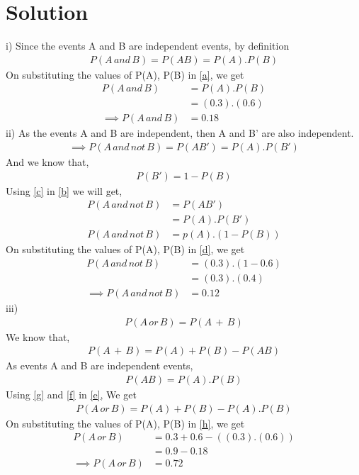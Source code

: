 \documentclass[journal,12pt,twocolumn]{IEEEtran}
\begin{document}
\section{Solution}
i)
Since the events A and B are independent events, by definition
\begin{align}
    P(A\, and\, B) = P(AB) = P(A).P(B)\label{a}
\end{align}
On substituting the values of P(A), P(B) in \eqref{a}, we get
\begin{align}
    P(A\, and\, B) &= P(A).P(B)\\
    &= (0.3).(0.6)\\
    \implies P(A\, and\, B)&=0.18
\end{align}
ii)
As the events A and B are independent, then A and B' are also independent.
\begin{align}   
\implies P(A\, and\,not\, B) =P(AB') = P(A).P(B')\label{b}
\end{align}
And we know that,
\begin{align}
    P(B')=1-P(B)\label{c}
\end{align}
Using \eqref{c} in \eqref{b} we will get,
\begin{align}
    P(A\, and\,not\, B) &=P(AB') \\
    &= P(A).P(B')\\
    P(A\, and\,not\, B)&= p(A).(1-P(B))\label{d}
\end{align}
On substituting the values of P(A), P(B) in \eqref{d}, we get
\begin{align}
    P(A\, and\, not\, B) &= (0.3).(1-0.6)\\
    &= (0.3).(0.4)\\
    \implies P(A\, and\, not\, B)&= 0.12
\end{align}
iii)
\begin{align}
    P(A\,or\,B) =P(A\,+\,B)\label{e}
\end{align}
We know that,
\begin{align}
    P(A\, +\, B) = P(A) + P(B) -P(AB)\label{f}
\end{align}
As events A and B are independent events,
\begin{align}
    P(AB)=P(A).P(B)\label{g}
\end{align}
Using \eqref{g} and \eqref{f} in \eqref{e}, We get
\begin{align}
    P(A\,or\,B) = P(A) + P(B) - P(A).P(B)\label{h}
\end{align}
On substituting the values of P(A), P(B) in \eqref{h}, we get
\begin{align}
    P(A\,or\,B) &= 0.3 + 0.6 -((0.3).(0.6))\\
    &= 0.9-0.18\\
    \implies P(A\,or\,B) &= 0.72\label{i}
\end{align}
\end{document}
